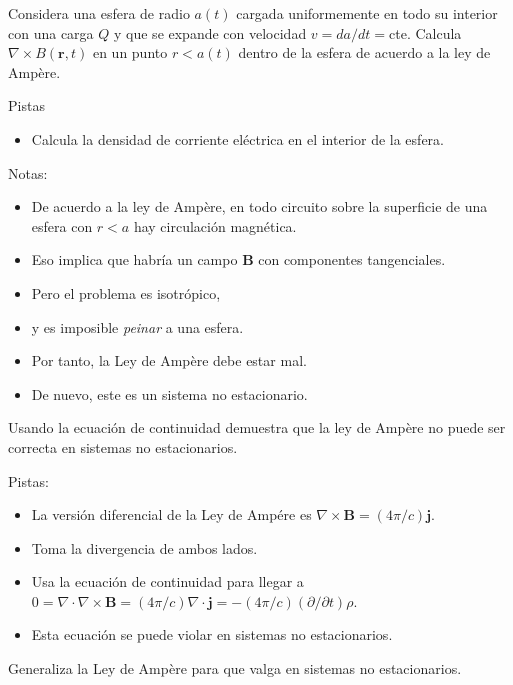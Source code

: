 \documentclass{exam}
\begin{document}
\begin{questions}
\question\label{3} Considera una esfera de radio $a(t)$ cargada uniformemente en
  todo su interior con una carga $Q$ y que se expande con velocidad
  $v=da/dt=$cte. Calcula $\nabla\times B(\bm r,t)$ en un punto $r<a(t)$
  dentro de la esfera de acuerdo a la ley de Ampère.

  Pistas
  \begin{itemize}
  \item Calcula la densidad de corriente eléctrica en el interior de
    la esfera.
  \end{itemize}

  Notas:
  \begin{itemize}
  \item De acuerdo a la ley de Ampère, en todo circuito sobre la
    superficie de una esfera con $r<a$ hay circulación magnética.
  \item Eso implica que habría un campo $\bm B$ con componentes
    tangenciales.
  \item Pero el problema es isotrópico,
  \item y es imposible {\em peinar} a una esfera.
  \item Por tanto, la Ley de Ampère debe estar mal.
  \item De nuevo, este es un sistema no estacionario.
  \end{itemize}

\question\label{4} Usando la ecuación de continuidad demuestra que la ley de
  Ampère no puede ser correcta en sistemas no estacionarios.

  Pistas:
  \begin{itemize}
  \item La versión diferencial de la Ley de Ampére es $\nabla\times\bm
    B=(4\pi/c)\bm j$.
  \item Toma la divergencia de ambos lados.
  \item Usa la ecuación de continuidad para llegar a
    $0=\nabla\cdot\nabla\times\bm B=(4\pi/c)\nabla\cdot\bm
    j=-(4\pi/c)(\partial/\partial t)\rho$.
  \item Esta ecuación se puede violar en sistemas no estacionarios.
  \end{itemize}

\question\label{5} Generaliza la Ley de Ampère para que valga en sistemas no
  estacionarios.


\end{questions}
\end{document}
